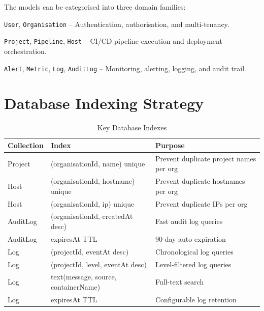 \documentclass[12pt,a4paper,twoside]{report}
\begin{document}
The models can be categorised into three domain families:

\begin{description}[style=nextline]
  \item[\textbf{Identity Domain}] \texttt{User}, \texttt{Organisation} -- Authentication, authorisation, and multi-tenancy.
  \item[\textbf{Delivery Domain}] \texttt{Project}, \texttt{Pipeline}, \texttt{Host} -- CI/CD pipeline execution and deployment orchestration.
  \item[\textbf{Observability Domain}] \texttt{Alert}, \texttt{Metric}, \texttt{Log}, \texttt{AuditLog} -- Monitoring, alerting, logging, and audit trail.
\end{description}

\section{Database Indexing Strategy}

\begin{table}[H]
\centering
\caption{Key Database Indexes}
\label{tab:indexes}
\begin{tabularx}{\textwidth}{l|l|X}
\toprule
\textbf{Collection} & \textbf{Index} & \textbf{Purpose} \\
\midrule
Project & (organisationId, name) unique & Prevent duplicate project names per org \\
Host & (organisationId, hostname) unique & Prevent duplicate hostnames per org \\
Host & (organisationId, ip) unique & Prevent duplicate IPs per org \\
AuditLog & (organisationId, createdAt desc) & Fast audit log queries \\
AuditLog & expiresAt TTL & 90-day auto-expiration \\
Log & (projectId, eventAt desc) & Chronological log queries \\
Log & (projectId, level, eventAt desc) & Level-filtered log queries \\
Log & text(message, source, containerName) & Full-text search \\
Log & expiresAt TTL & Configurable log retention \\
\bottomrule
\end{tabularx}
\end{table}


\end{document}
